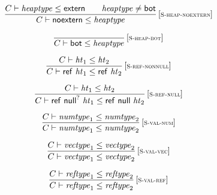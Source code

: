 $$
\begin{array}{@{}c@{}}\displaystyle
\frac{
C \vdash {\mathit{heaptype}} \leq \mathsf{extern}
 \qquad
{\mathit{heaptype}} \neq \mathsf{bot}
}{
C \vdash \mathsf{noextern} \leq {\mathit{heaptype}}
} \, {[\textsc{\scriptsize S{-}heap{-}noextern}]}
\qquad
\end{array}
$$

$$
\begin{array}{@{}c@{}}\displaystyle
\frac{
}{
C \vdash \mathsf{bot} \leq {\mathit{heaptype}}
} \, {[\textsc{\scriptsize S{-}heap{-}bot}]}
\qquad
\end{array}
$$

\vspace{1ex}

$$
\begin{array}{@{}c@{}}\displaystyle
\frac{
C \vdash {\mathit{ht}}_1 \leq {\mathit{ht}}_2
}{
C \vdash \mathsf{ref}~{\mathit{ht}}_1 \leq \mathsf{ref}~{\mathit{ht}}_2
} \, {[\textsc{\scriptsize S{-}ref{-}nonnull}]}
\qquad
\end{array}
$$

$$
\begin{array}{@{}c@{}}\displaystyle
\frac{
C \vdash {\mathit{ht}}_1 \leq {\mathit{ht}}_2
}{
C \vdash \mathsf{ref}~{\mathsf{null}^?}~{\mathit{ht}}_1 \leq \mathsf{ref}~\mathsf{null}~{\mathit{ht}}_2
} \, {[\textsc{\scriptsize S{-}ref{-}null}]}
\qquad
\end{array}
$$

\vspace{1ex}

$$
\begin{array}{@{}c@{}}\displaystyle
\frac{
C \vdash {\mathit{numtype}}_1 \leq {\mathit{numtype}}_2
}{
C \vdash {\mathit{numtype}}_1 \leq {\mathit{numtype}}_2
} \, {[\textsc{\scriptsize S{-}val{-}num}]}
\qquad
\end{array}
$$

$$
\begin{array}{@{}c@{}}\displaystyle
\frac{
C \vdash {\mathit{vectype}}_1 \leq {\mathit{vectype}}_2
}{
C \vdash {\mathit{vectype}}_1 \leq {\mathit{vectype}}_2
} \, {[\textsc{\scriptsize S{-}val{-}vec}]}
\qquad
\end{array}
$$

$$
\begin{array}{@{}c@{}}\displaystyle
\frac{
C \vdash {\mathit{reftype}}_1 \leq {\mathit{reftype}}_2
}{
C \vdash {\mathit{reftype}}_1 \leq {\mathit{reftype}}_2
} \, {[\textsc{\scriptsize S{-}val{-}ref}]}
\qquad
\end{array}
$$

